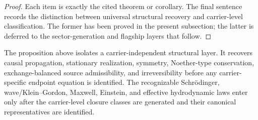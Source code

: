 \begin{proof}
Each item is exactly the cited theorem or corollary. The final sentence records
the distinction between universal structural recovery and carrier-level
classification. The former has been proved in the present subsection; the
latter is deferred to the sector-generation and flagship layers that follow.
\end{proof}

\begin{remark}
\label{rem:what-universal-recovery-does-not-claim}
The proposition above isolates a carrier-independent structural layer. It
recovers causal propagation, stationary realization, symmetry, Noether-type
conservation, exchange-balanced source admissibility, and irreversibility
before any carrier-specific endpoint equation is identified. The recognizable
Schr\"odinger, wave/Klein--Gordon, Maxwell, Einstein, and effective
hydrodynamic laws enter only after the carrier-level closure classes are
generated and their canonical representatives are identified.
\end{remark}



